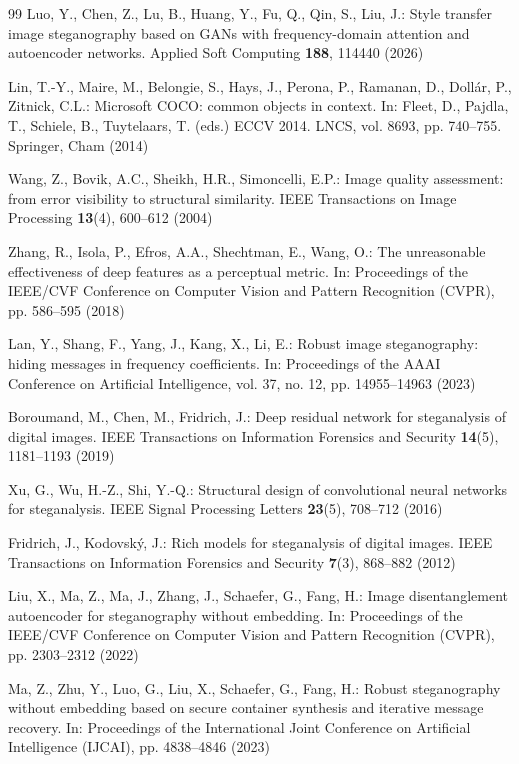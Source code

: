 \documentclass[runningheads]{llncs}
\begin{document}
\begin{thebibliography}{99}
Luo, Y., Chen, Z., Lu, B., Huang, Y., Fu, Q., Qin, S., Liu, J.: Style transfer image steganography based on GANs with frequency-domain attention and autoencoder networks. Applied Soft Computing \textbf{188}, 114440 (2026)

Lin, T.-Y., Maire, M., Belongie, S., Hays, J., Perona, P., Ramanan, D., Doll\'ar, P., Zitnick, C.L.: Microsoft COCO: common objects in context. In: Fleet, D., Pajdla, T., Schiele, B., Tuytelaars, T. (eds.) ECCV 2014. LNCS, vol. 8693, pp. 740--755. Springer, Cham (2014)

Wang, Z., Bovik, A.C., Sheikh, H.R., Simoncelli, E.P.: Image quality assessment: from error visibility to structural similarity. IEEE Transactions on Image Processing \textbf{13}(4), 600--612 (2004)

Zhang, R., Isola, P., Efros, A.A., Shechtman, E., Wang, O.: The unreasonable effectiveness of deep features as a perceptual metric. In: Proceedings of the IEEE/CVF Conference on Computer Vision and Pattern Recognition (CVPR), pp. 586--595 (2018)

Lan, Y., Shang, F., Yang, J., Kang, X., Li, E.: Robust image steganography: hiding messages in frequency coefficients. In: Proceedings of the AAAI Conference on Artificial Intelligence, vol. 37, no. 12, pp. 14955--14963 (2023)

Boroumand, M., Chen, M., Fridrich, J.: Deep residual network for steganalysis of digital images. IEEE Transactions on Information Forensics and Security \textbf{14}(5), 1181--1193 (2019)

Xu, G., Wu, H.-Z., Shi, Y.-Q.: Structural design of convolutional neural networks for steganalysis. IEEE Signal Processing Letters \textbf{23}(5), 708--712 (2016)

Fridrich, J., Kodovsk\'y, J.: Rich models for steganalysis of digital images. IEEE Transactions on Information Forensics and Security \textbf{7}(3), 868--882 (2012)

Liu, X., Ma, Z., Ma, J., Zhang, J., Schaefer, G., Fang, H.: Image disentanglement autoencoder for steganography without embedding. In: Proceedings of the IEEE/CVF Conference on Computer Vision and Pattern Recognition (CVPR), pp. 2303--2312 (2022)

Ma, Z., Zhu, Y., Luo, G., Liu, X., Schaefer, G., Fang, H.: Robust steganography without embedding based on secure container synthesis and iterative message recovery. In: Proceedings of the International Joint Conference on Artificial Intelligence (IJCAI), pp. 4838--4846 (2023)


\end{thebibliography}
\end{document}
